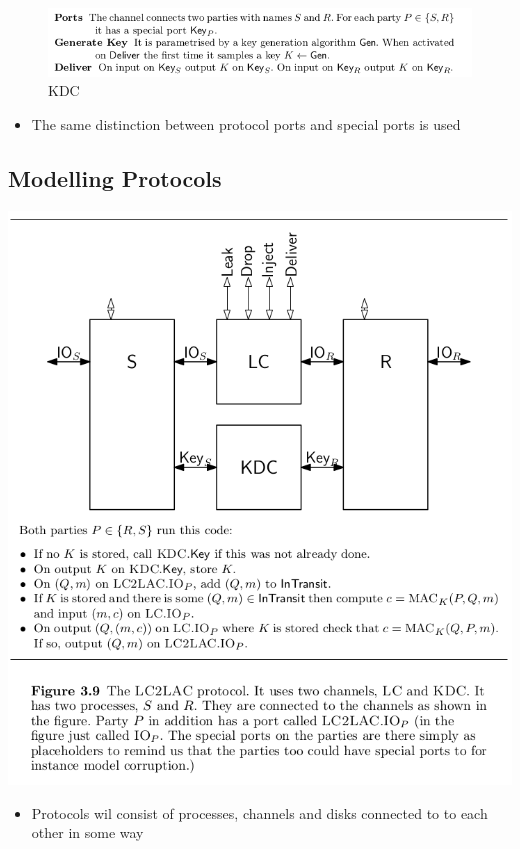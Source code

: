 \documentclass[11pt]{article}
\begin{document}
\begin{figure}[htbp]
\centering
\includegraphics[width=.9\linewidth]{A Syntax for Distributed Systems (3)/screenshot_2018-09-02_12-09-02.png}
\caption{\label{fig:org2ba306d}
KDC}
\end{figure}


\begin{itemize}
\item The same distinction between protocol ports and special ports is used
\end{itemize}

\subsection{Modelling Protocols}
\label{sec:orgbd79b4e}
\begin{center}
\includegraphics[width=.9\linewidth]{A Syntax for Distributed Systems (3)/screenshot_2018-09-02_12-17-35.png}
\end{center}
\begin{itemize}
\item Protocols wil consist of processes, channels and disks connected to to each other in some way
\end{itemize}
\end{document}
